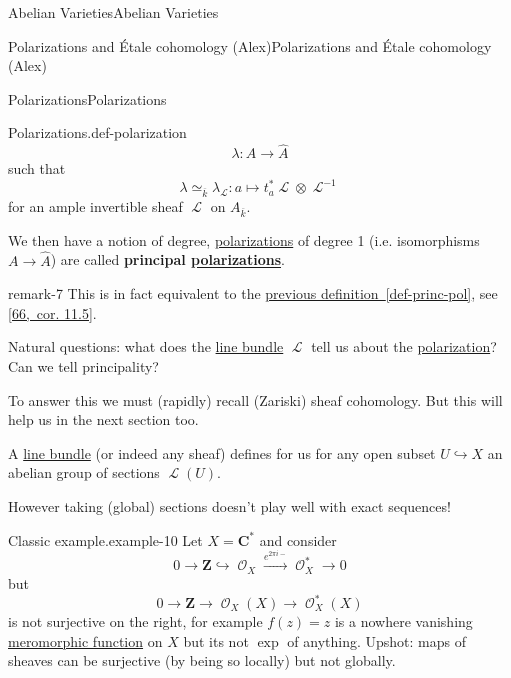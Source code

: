 \documentclass[10pt,]{book}
\newcommand{\terminology}[1]{\textbf{#1}}
\numberwithin{equation}{section}
\newcommand{\sheaf}[1]{\operatorname{\mathcal{#1}}}
\newcommand{\ZZ}{\mathbf{Z}}
\newcommand{\CC}{\mathbf{C}}
\begin{document}
\begin{chapterptx}{Abelian Varieties}{}{Abelian Varieties}{}{}
\begin{sectionptx}{Polarizations and Étale cohomology (Alex)}{}{Polarizations and Étale cohomology (Alex)}{}{}
\begin{subsectionptx}{Polarizations}{}{Polarizations}{}{}
\begin{definition}{Polarizations.}{def-polarization}
\begin{equation*}
\lambda \colon A \to \hat A
\end{equation*}
such that%
\begin{equation*}
\lambda \simeq_{\overline k} \lambda_{\sheaf{L}} : a\mapsto t_a^*\sheaf L \otimes \sheaf L^{-1}
\end{equation*}
for an ample invertible sheaf \(\sheaf L\) on \(A_{\overline k}\).%
\par
\hypertarget{p-245}{}%
We then have a notion of degree, \hyperref[def-polarization]{polarizations} of degree 1 (i.e. isomorphisms \(A\to \hat A\)) are called \terminology{principal \hyperref[def-polarization]{polarizations}}.%
\end{definition}
\begin{remark}{}{remark-7}%
\hypertarget{p-246}{}%
This is in fact equivalent to the \hyperref[def-princ-pol]{previous definition~\ref{def-princ-pol}}, see \hyperlink{bib-vandergeer-moonen}{[66,~cor. 11.5]}.%
\end{remark}
\hypertarget{p-247}{}%
Natural questions: what does the \hyperref[def-line-bundle]{line bundle} \(\sheaf L\) tell us about the \hyperref[def-polarization]{polarization}? Can we tell principality?%
\par
\hypertarget{p-248}{}%
To answer this we must (rapidly) recall (Zariski) sheaf cohomology. But this will help us in the next section too.%
\par
\hypertarget{p-249}{}%
A \hyperref[def-line-bundle]{line bundle} (or indeed any sheaf) defines for us for any open subset \(U \hookrightarrow X\) an abelian group of sections \(\sheaf L(U)\).%
\par
\hypertarget{p-250}{}%
However taking (global) sections doesn't play well with exact sequences!%
\begin{example}{Classic example.}{example-10}%
\hypertarget{p-251}{}%
Let \(X = \CC^*\) and consider%
\begin{equation*}
0 \to \ZZ \hookrightarrow \sheaf O_X \xrightarrow{e^{2\pi i -}} \sheaf O_X^* \to 0
\end{equation*}
but%
\begin{equation*}
0 \to \ZZ \to \sheaf O_X(X) \to \sheaf O_X^*(X)
\end{equation*}
is not surjective on the right, for example \(f(z) = z\) is a nowhere vanishing \hyperref[def-morph-riem-surf]{meromorphic function} on \(X\) but its not \(\exp\) of anything. Upshot: maps of sheaves can be surjective (by being so locally) but not globally.%
\end{example}

\end{subsectionptx}
\end{sectionptx}
\end{chapterptx}
\end{document}
